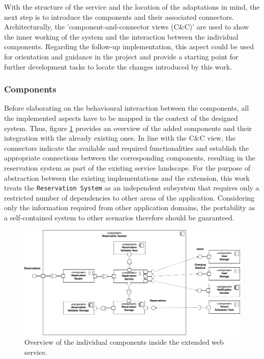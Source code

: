 \noindent With the structure of the service and the location of the adaptations in mind, the next step is to introduce the components and their associated connectors. Architecturally, the 'component-and-connector views (C\&C)' \cite[p.~136]{clements_documenting_2011} are used to show the inner working of the system and the interaction between the individual components. 
Regarding the follow-up implementation, this aspect could be used for orientation and guidance in the project and provide a starting point for further development tasks to locate the changes introduced by this work.

\subsubsection{Components}
\label{ch:Implementation:sec:Reservation System:ssec:Architectural Views:sssec:Components}

Before elaborating on the behavioural interaction between the components, all the implemented aspects have to be mapped in the context of the designed system. Thus, figure \ref{fig:component-view} provides an overview of the added components and their integration with the already existing ones.
In line with the C\&C view, the connectors indicate the available and required functionalities and establish the appropriate connections between the corresponding components, resulting in the reservation system as part of the existing service landscape.
For the purpose of abstraction between the existing implementations and the extension, this work treats the \texttt{Reservation System} as an independent subsystem that requires only a restricted number of dependencies to other areas of the application.
Considering only the information required from other application domains, the portability as a self-contained system to other scenarios therefore should be guaranteed.

\begin{figure}[h]
    \centering
    \includegraphics[scale=0.4]{resources/images/main/6_implementation/ReservationComponents.png}
    \caption{Overview of the individual components inside the extended web service.}
    \label{fig:component-view}
\end{figure}

